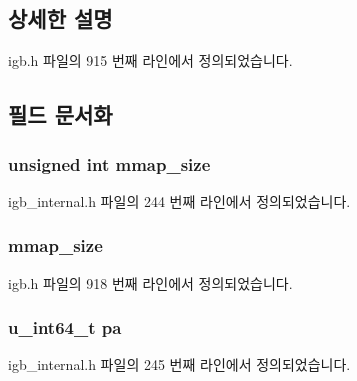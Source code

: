 \subsection{상세한 설명}


igb.\+h 파일의 915 번째 라인에서 정의되었습니다.



\subsection{필드 문서화}
\subsubsection[{\texorpdfstring{mmap\+\_\+size}{mmap_size}}]{\setlength{\rightskip}{0pt plus 5cm}unsigned int mmap\+\_\+size}\hypertarget{structigb__buf__cmd_a8258a70481ee5ece54c23de98e767611}{}\label{structigb__buf__cmd_a8258a70481ee5ece54c23de98e767611}


igb\+\_\+internal.\+h 파일의 244 번째 라인에서 정의되었습니다.

\subsubsection[{\texorpdfstring{mmap\+\_\+size}{mmap_size}}]{ mmap\+\_\+size}\hypertarget{structigb__buf__cmd_ac76710c49696b7df6ecbef456496ea50}{}\label{structigb__buf__cmd_ac76710c49696b7df6ecbef456496ea50}


igb.\+h 파일의 918 번째 라인에서 정의되었습니다.

\subsubsection[{\texorpdfstring{pa}{pa}}]{\setlength{\rightskip}{0pt plus 5cm}u\+\_\+int64\+\_\+t pa}\hypertarget{structigb__buf__cmd_a20b4a811fcc92dd2921fb495678f70c9}{}\label{structigb__buf__cmd_a20b4a811fcc92dd2921fb495678f70c9}


igb\+\_\+internal.\+h 파일의 245 번째 라인에서 정의되었습니다.

